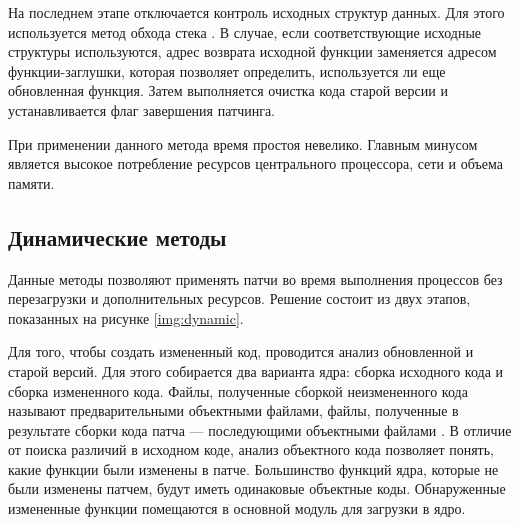 На последнем этапе отключается контроль исходных структур данных. Для этого используется метод обхода стека \cite{lucos}. В случае, если соответствующие исходные структуры используются, адрес возврата исходной функции заменяется адресом функции-заглушки, которая позволяет определить, используется ли еще обновленная функция. Затем выполняется очистка кода старой версии и устанавливается флаг завершения патчинга.

При применении данного метода время простоя невелико. Главным минусом является высокое потребление ресурсов центрального процессора, сети и объема памяти.

\subsection{Динамические методы}

Данные методы \cite{dynamos} позволяют применять патчи во время выполнения процессов без перезагрузки и дополнительных ресурсов. Решение состоит из двух этапов, показанных на рисунке \ref{img:dynamic}.

Для того, чтобы создать измененный код, проводится анализ обновленной и старой	версий. Для этого собирается два варианта ядра: сборка исходного кода и сборка измененного кода. Файлы, полученные сборкой неизмененного кода называют предварительными объектными файлами, файлы, полученные в результате сборки кода патча --- последующими объектными файлами \cite{ksplice}. В отличие от поиска различий в исходном коде, анализ объектного кода позволяет понять, какие функции были изменены в патче. Большинство функций ядра, которые не были изменены патчем, будут иметь одинаковые объектные коды. Обнаруженные измененные функции помещаются в основной модуль для загрузки в ядро.

